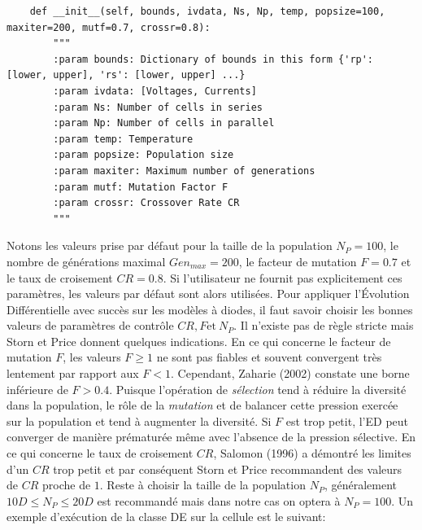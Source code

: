 \begin{verbatim}
    def __init__(self, bounds, ivdata, Ns, Np, temp, popsize=100, maxiter=200, mutf=0.7, crossr=0.8):
        """
        :param bounds: Dictionary of bounds in this form {'rp': [lower, upper], 'rs': [lower, upper] ...}
        :param ivdata: [Voltages, Currents]
        :param Ns: Number of cells in series
        :param Np: Number of cells in parallel
        :param temp: Temperature
        :param popsize: Population size
        :param maxiter: Maximum number of generations
        :param mutf: Mutation Factor F
        :param crossr: Crossover Rate CR
        """
\end{verbatim}
Notons les valeurs prise par défaut pour la taille de la population $N_P = 100$, le nombre de générations maximal $Gen_{max} = 200$, le facteur de mutation $F = 0.7$ et le taux de croisement $CR = 0.8$. Si l'utilisateur ne fournit pas explicitement ces paramètres, les valeurs par défaut sont alors utilisées.
Pour appliquer l'Évolution Différentielle avec succès sur les modèles à diodes, il faut savoir choisir les bonnes valeurs de paramètres de contrôle $CR, F \text{et}\  N_P$. Il n'existe pas de règle stricte mais Storn et Price \cite{Price2005} donnent quelques indications. En ce qui concerne le facteur de mutation $F$, les valeurs $F \geq 1$ ne sont pas fiables et souvent convergent très lentement par rapport aux $F < 1$. Cependant, Zaharie (2002) \cite{Zaharie2002} constate une borne inférieure de $F > 0.4$. Puisque l'opération de \textit{sélection} tend à réduire la diversité dans la population, le rôle de la \textit{mutation} et de balancer cette pression exercée sur la population et tend à augmenter la diversité. Si $F$ est trop petit, l'ED peut converger de manière prématurée même avec l'absence de la pression sélective. En ce qui concerne le taux de croisement $CR$, Salomon (1996) \cite{Salomon1996} a démontré les limites d'un $CR$ trop petit et par conséquent Storn et Price recommandent des valeurs de $CR$ proche de $1$. Reste à choisir la taille de la population $N_P$, généralement $10D \leq N_P \leq 20D$ est recommandé mais dans notre cas on optera à $N_P = 100$.
Un exemple d'exécution de la classe DE sur la cellule est le suivant:
